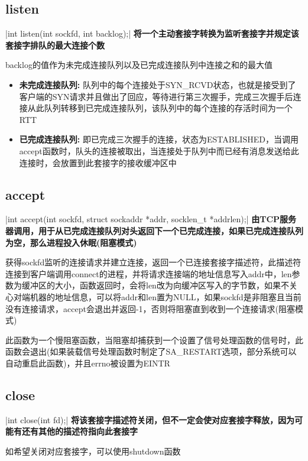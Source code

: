\subsection{listen}
|int listen(int sockfd, int backlog);|
\noindent \textbf{将一个主动套接字转换为监听套接字并规定该套接字排队的最大连接个数}
\begin{spacing}{2.0}
	backlog的值作为未完成连接队列以及已完成连接队列中连接之和的最大值
	\begin{itemize}
		\item \textbf{未完成连接队列:} 队列中的每个连接处于SYN\_RCVD状态，也就是接受到了客户端的SYN请求并且做出了回应，等待进行第三次握手，完成三次握手后连接从此队列转移到已完成连接队列，该队列中的每个连接的存活时间为一个RTT
		\item \textbf{已完成连接队列:} 即已完成三次握手的连接，状态为ESTABLISHED，当调用accept函数时，队头的连接被取出，当连接处于队列中而已经有消息发送给此连接时，会放置到此套接字的接收缓冲区中 
	\end{itemize}
\end{spacing}
\newpage

\subsection{accept}
|int accept(int sockfd, struct sockaddr *addr, socklen_t *addrlen);|
\noindent \textbf{由TCP服务器调用，用于从已完成连接队列对头返回下一个已完成连接，如果已完成连接队列为空，那么进程投入休眠(阻塞模式)}
\begin{spacing}{2.0}
获得sockfd监听的连接请求并建立连接，返回一个已连接套接字描述符，此描述符连接到客户端调用connect的进程，并将请求连接端的地址信息写入addr中，len参数为缓冲区的大小，函数返回时，会将len改为向缓冲区写入的字节数，如果不关心对端机器的地址信息，可以将addr和len置为NULL，如果sockfd是非阻塞且当前没有连接请求，accept会退出并返回-1，否则将阻塞直到收到一个连接请求(阻塞模式)

此函数为一个慢阻塞函数，当阻塞却捕获到一个设置了信号处理函数的信号时，此函数会退出(如果装载信号处理函数时制定了SA\_RESTART选项，部分系统可以自动重启此函数)，并且errno被设置为EINTR
\end{spacing}
\newpage

\subsection{close}
|int close(int fd);|
\noindent \textbf{将该套接字描述符关闭，但不一定会使对应套接字释放，因为可能有还有其他的描述符指向此套接字}
\begin{spacing}{2.0}
	如希望关闭对应套接字，可以使用shutdown函数
\end{spacing}
\newpage

